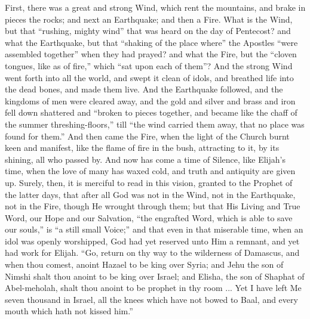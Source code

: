 First, there was a great and strong Wind, which rent the mountains,
and brake in pieces the rocks; and next an Earthquake; and then a
Fire. What is the Wind, but that ``rushing, mighty wind'' that
was heard on the day of Pentecost? and what the Earthquake, but that
``shaking of the place where'' the Apostles ``were
assembled together'' when they had prayed? and what the Fire, but
the ``cloven tongues, like as of fire,'' which ``sat upon
each of them''? And the strong Wind went forth into all the world,
and swept it clean of idols, and breathed life into the dead bones,
and made them live. And the Earthquake followed, and the kingdoms of
men were cleared away, and the gold and silver and brass and iron fell
down shattered and ``broken to pieces together, and became like
the chaff of the summer threshing-floors,'' till ``the wind
carried them away, that no place was found for them.'' And then
came the Fire, when the light of the Church burnt keen and manifest,
like the flame of fire in the bush, attracting to it, by its shining,
all who passed by. And now has come a time of Silence, like Elijah's
time, when the love of many has waxed cold, and truth and antiquity
are given up. Surely, then, it is merciful to read in this vision,
granted to the Prophet of the latter days, that after all God was not
in the Wind, not in the Earthquake, not in the Fire, though He wrought
through them; but that His Living and True Word, our Hope and our
Salvation, ``the engrafted Word, which is able to save our
souls,'' is ``a still small Voice;'' and that even in that
miserable time, when an idol was openly worshipped, God had yet
reserved unto Him a remnant, and yet had work for Elijah. ``Go,
return on thy way to the wilderness of Damascus, and when thou comest,
anoint Hazael to be king over Syria; and Jehu the son of Nimshi shalt
thou anoint to be king over Israel; and Elisha, the son of Shaphat of
Abel-meholah, shalt thou anoint to be prophet in thy room ... Yet I
have left Me seven thousand in Israel, all the knees which have not
bowed to Baal, and every mouth which hath not kissed him.''


